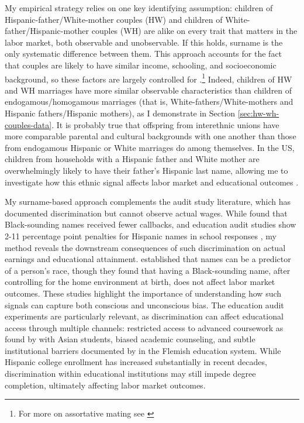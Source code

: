 My empirical strategy relies on one key identifying assumption: children of Hispanic-father/White-mother couples (HW) and children of White-father/Hispanic-mother couples (WH) are alike on every trait that matters in the labor market, both observable and unobservable. If this holds, surname is the only systematic difference between them. This approach accounts for the fact that couples are likely to have similar income, schooling, and socioeconomic background, so these factors are largely controlled for \autocite{averettBetterWorseRelationship2008, averettEconomicRealityBeauty1996}.\footnote{For more on assortative mating see \textcite{beckerTheoryMarriagePart1973, beckerTheoryMarriagePart1974, beckerTreatiseFamily1993, browningCollectiveUnitaryModels2006, chiapporiFatterAttractionAnthropometric2012}} Indeed, children of HW and WH marriages have more similar observable characteristics than children of endogamous/homogamous marriages (that is, White-fathers/White-mothers and Hispanic fathers/Hispanic mothers), as I demonstrate in Section \ref{sec:hw-wh-couples-data}. It is probably true that offspring from interethnic unions have more comparable parental and cultural backgrounds with one another than those from endogamous Hispanic or White marriages do among themselves. In the US, children from households with a Hispanic father and White mother are overwhelmingly likely to have their father's Hispanic last name, allowing me to investigate how this ethnic signal affects labor market and educational outcomes \autocite{davenport2016role}.

My surname-based approach complements the audit study literature, which has documented discrimination but cannot observe actual wages. While \textcite{bertrand2004emily} found that Black-sounding names received fewer callbacks, and education audit studies show 2-11 percentage point penalties for Hispanic names in school responses \autocite{bergman2018education, gaddis2024racial}, my method reveals the downstream consequences of such discrimination on actual earnings and educational attainment. \textcite{fryer2004causes} established that names can be a predictor of a person's race, though they found that having a Black-sounding name, after controlling for the home environment at birth, does not affect labor market outcomes. These studies highlight the importance of understanding how such signals can capture both conscious and unconscious bias. The education audit experiments are particularly relevant, as discrimination can affect educational access through multiple channels: restricted access to advanced coursework as found by \textcite{janssen2022guidance} with Asian students, biased academic counseling, and subtle institutional barriers documented by \textcite{bourabain2023school} in the Flemish education system. While Hispanic college enrollment has increased substantially in recent decades, discrimination within educational institutions may still impede degree completion, ultimately affecting labor market outcomes.

